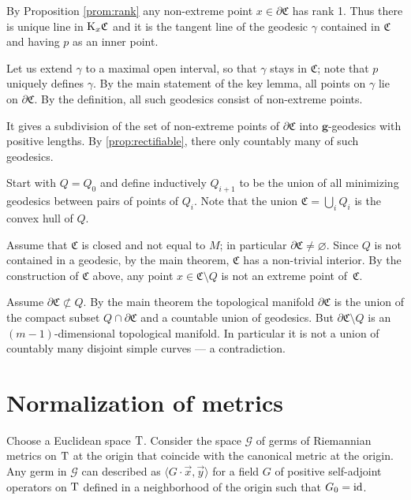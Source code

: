 \documentclass[a4paper,10pt]{article}
\begin{document}
By Proposition \ref{prom:rank} any non-extreme point $x\in \partial \mathfrak C$ has rank 1.
Thus there is unique line in $\mathrm{K}_x\mathfrak C$ and it is the tangent line of the geodesic $\gamma$ contained in $\mathfrak C$ and having $p$ as an inner point. 

Let us extend $\gamma$ to a maximal open interval, so that $\gamma$ stays in $\mathfrak C$;
note that $p$ uniquely defines $\gamma$. 
By the main statement of the key lemma, all points on $\gamma$ lie on $\partial \mathfrak C$.
By the definition, all such geodesics consist of non-extreme points.

It gives a subdivision of the set of non-extreme points of $\partial\mathfrak C$ into $\bm{g}$-geodesics with positive lengths.
By \ref{prop:rectifiable}, there only countably many of such geodesics.
\qeds

Start with $Q=Q_0$ and define inductively $Q_{i+1}$ to be the union of all minimizing geodesics between pairs of points of $Q_i$.
Note that the union $\mathfrak{C}= \bigcup_{i} 
Q_i$ is the convex hull of $Q$.

Assume that $\mathfrak{C}$ is closed and not equal to $M$; in particular $\partial\mathfrak{C}\ne \varnothing$.
Since $Q$ is not contained in a geodesic, by the main theorem, $\mathfrak{C}$ has a non-trivial interior.
By the construction of $\mathfrak{C}$ above, any point $x\in \mathfrak{C} \setminus Q$ is not an extreme point of~$\mathfrak{C}$.

Assume $\partial \mathfrak{C} \not\subset Q$.
By the main theorem the topological manifold $\partial \mathfrak{C}$ is the union of the compact subset $Q\cap \partial \mathfrak{C}$ and a countable union of geodesics.
But $\partial \mathfrak{C} \setminus Q$ is an $(m-1)$-dimensional topological manifold.
In particular it is not a union of countably many disjoint simple curves --- a contradiction.
\qeds


\section{Normalization of metrics}
\label{sec:normalization}

Choose a Euclidean space $\mathrm{T}$.
Consider the space $\mathcal{G}$ of germs of Riemannian metrics on $\mathrm{T}$ at the origin that coincide with the canonical metric at the origin.
Any germ in $\mathcal{G}$ can described as $\langle G\cdot \vec x,\vec y\rangle$ for a field $G$ of positive self-adjoint operators on $\mathrm{T}$ defined in a neighborhood of the origin such that $G_0=\mathrm{id}$.
\end{document}
